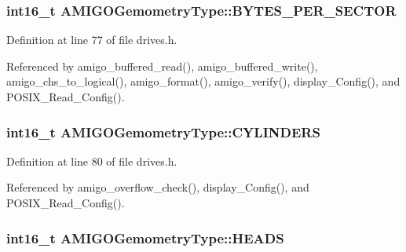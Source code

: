 \subsubsection[{\texorpdfstring{B\+Y\+T\+E\+S\+\_\+\+P\+E\+R\+\_\+\+S\+E\+C\+T\+OR}{BYTES_PER_SECTOR}}]{\setlength{\rightskip}{0pt plus 5cm}int16\+\_\+t A\+M\+I\+G\+O\+Gemometry\+Type\+::\+B\+Y\+T\+E\+S\+\_\+\+P\+E\+R\+\_\+\+S\+E\+C\+T\+OR}\hypertarget{structAMIGOGemometryType_a38dc0b559f00c78f30fe0c43c53b582a}{}\label{structAMIGOGemometryType_a38dc0b559f00c78f30fe0c43c53b582a}


Definition at line 77 of file drives.\+h.



Referenced by amigo\+\_\+buffered\+\_\+read(), amigo\+\_\+buffered\+\_\+write(), amigo\+\_\+chs\+\_\+to\+\_\+logical(), amigo\+\_\+format(), amigo\+\_\+verify(), display\+\_\+\+Config(), and P\+O\+S\+I\+X\+\_\+\+Read\+\_\+\+Config().

\subsubsection[{\texorpdfstring{C\+Y\+L\+I\+N\+D\+E\+RS}{CYLINDERS}}]{\setlength{\rightskip}{0pt plus 5cm}int16\+\_\+t A\+M\+I\+G\+O\+Gemometry\+Type\+::\+C\+Y\+L\+I\+N\+D\+E\+RS}\hypertarget{structAMIGOGemometryType_a4282aeb6c4aac3b8cfc09e29402dcd3f}{}\label{structAMIGOGemometryType_a4282aeb6c4aac3b8cfc09e29402dcd3f}


Definition at line 80 of file drives.\+h.



Referenced by amigo\+\_\+overflow\+\_\+check(), display\+\_\+\+Config(), and P\+O\+S\+I\+X\+\_\+\+Read\+\_\+\+Config().

\subsubsection[{\texorpdfstring{H\+E\+A\+DS}{HEADS}}]{\setlength{\rightskip}{0pt plus 5cm}int16\+\_\+t A\+M\+I\+G\+O\+Gemometry\+Type\+::\+H\+E\+A\+DS}\hypertarget{structAMIGOGemometryType_a33131d3948935e2064af9af151653033}{}\label{structAMIGOGemometryType_a33131d3948935e2064af9af151653033}


